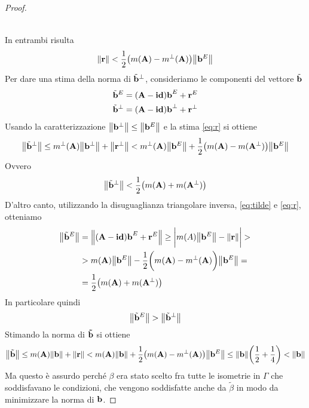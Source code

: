 \documentclass[a4paper,11pt,openright,twoside	]{book}
\begin{document}
\begin{proof}
\begin{itemize}
\begin{equation}
\begin{split}
\end{split}
\end{equation} 
\end{itemize}
In entrambi risulta 
\begin{equation}
 \label{eq:r} 
 \norm{\vb{r}} < \frac{1}{2} \big( m(\vb{A}) - m^{\perp}(\vb{A}) \big)\norm{\vb{b}^{E}} 
 \end{equation}
Per dare una stima della norma di $\tilde{\vb{b}}^{\perp}$, consideriamo le componenti del vettore $\tilde{\vb{b}}$ 
\begin{equation}
\label{eq:tilde}
\begin{split}
	\tilde{\vb{b}}^{E} & = (\vb{A-id) b}^{E} + \vb{r}^{E} \\
	\tilde{\vb{b}}^{\perp} & = (\vb{A-id) b}^{\perp} + \vb{r}^{\perp} \\
\end{split}
\end{equation}
Usando la caratterizzazione $\norm{\vb{b}^{\perp}} \leq \norm{\vb{b}^E}$ e la stima \ref{eq:r} si ottiene
\[ \norm{\tilde{\vb{b}}^{\perp}} \leq  m^{\perp}(\vb{A}) \norm{\vb{b}^{\perp}} + \norm{\vb{r}^{\perp}} < m^{\perp}(\vb{A}) \norm{\vb{b}^{E}} + \frac{1}{2} \big( m(\vb{A}) - m(\vb{A}^{\perp}) \big)\norm{\vb{b}^{E}}  \] 
Ovvero
\[ \norm{\tilde{\vb{b}}^{\perp}} < \frac{1}{2} \big( m(\vb{A}) + m(\vb{A}^{\perp}) \big) \]
D'altro canto, utilizzando la disuguaglianza triangolare inversa, \ref{eq:tilde} e  \ref{eq:r}, otteniamo
\begin{equation}
\label{eq:e}
\begin{split}
	\norm{\tilde{\vb{b}}^{E} } & = \norm{(\vb{A-id) b}^{E} + \vb{r}^{E}} \geq \bigg| m(A) \norm{\vb{b}^E} - \norm{\vb{r}}\bigg| > \\
	& > m(\vb{A}) \norm{\vb{b}^E} - \frac{1}{2} \bigg( m(\vb{A}) - m^{\perp}(\vb{A})\bigg)\norm{\vb{b}^E} = \\
	& = \frac{1}{2} \big( m(\vb{A}) + m(\vb{A}^{\perp}) \big)
\end{split}
\end{equation}
In particolare quindi 
\[ \norm{\tilde{\vb{b}}^{E}} > \norm{\tilde{\vb{b}}^{\perp}}\]
Stimando la norma di $\vb{\tilde{b}}$ si ottiene 
\[ \norm{\tilde{\vb{b}}} \leq m(\vb{A}) \norm{\vb{b}} + \norm{\vb{r}} < m(\vb{A})\norm{\vb{b}} + \frac{1}{2} \big( m(\vb{A}) - m^{\perp}(\vb{A}) \big)\norm{\vb{b}^{E}} \leq  \norm{\vb{b}} \bigg( \frac{1}{2} + \frac{1}{4}\bigg) < \norm{\vb{b}} \]
Ma questo è assurdo perché $\beta$ era stato scelto fra tutte le isometrie in $\Gamma$ che soddisfavano le condizioni, che vengono soddisfatte anche da $\tilde{\beta}$  in modo da minimizzare la norma di $\vb{b}$.
\end{proof}
\end{document}
